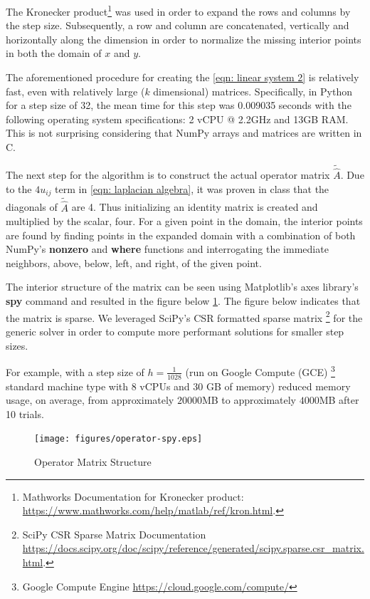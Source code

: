 \documentclass[10pt,a4paper]{article}
\begin{document}
The Kronecker product\footnote{Mathworks Documentation for Kronecker product: \url{https://www.mathworks.com/help/matlab/ref/kron.html}.} was used in order to expand the rows and columns by the step size. Subsequently, a row and column are concatenated, vertically and horizontally along the dimension in order to normalize the missing interior points in both the domain of $x$ and $y$.

The aforementioned procedure for creating the \cref{eqn: linear system 2} is relatively fast, even with relatively large ($k$ dimensional) matrices. Specifically, in Python for a step size of 32, the mean time for this step was 0.009035 seconds with the following operating system specifications: 2 vCPU @ 2.2GHz and 13GB RAM. This is not surprising considering that NumPy arrays and matrices are written in C.


The next step for the algorithm is to construct the actual operator matrix $\tilde{\hat{A}}$. Due to the $4u_{ij}$ term in \cref{eqn: laplacian algebra}, it was proven in class that the diagonals of $\tilde{\hat{A}}$ are 4. Thus initializing an identity matrix is created and multiplied by the scalar, four. For a given point in the domain, the interior points are found by finding points in the expanded domain with a combination of both NumPy's \textbf{nonzero} and \textbf{where} functions and interrogating the immediate neighbors, above, below, left, and right, of the given point.

% 


The interior structure of the matrix can be seen using Matplotlib's axes library's \textbf{spy} command and resulted in the figure below \cref{fig: operator matrix}. The figure below indicates that the matrix is sparse. We leveraged SciPy's CSR formatted sparse matrix \footnote{SciPy CSR Sparse Matrix Documentation \url{https://docs.scipy.org/doc/scipy/reference/generated/scipy.sparse.csr_matrix.html}.} for the generic solver in order to compute more performant solutions for smaller step sizes.

For example, with a step size of $h = \frac{1}{1028}$ (run on Google Compute (GCE) \footnote{Google Compute Engine \url{https://cloud.google.com/compute/}}  standard machine type with 8 vCPUs and 30 GB of memory) reduced memory usage, on average, from approximately $20000$MB to approximately $4000$MB after 10 trials. 

\begin{figure}[H]
\center
\texttt{[image: figures/operator-spy.eps]}
\caption{Operator Matrix Structure}
\label{fig: operator matrix}
\end{figure}
\end{document}
